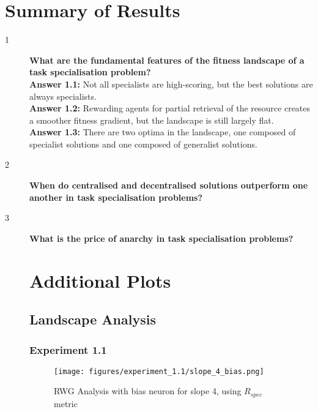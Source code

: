 \documentclass[12pt]{article}
\begin{document}
\appendix

\section{Summary of Results}

\begin{description}
\item[1] \textbf{What are the fundamental features of the fitness landscape of a task specialisation problem?}\\

\textbf{Answer 1.1:} Not all specialists are high-scoring, but the best solutions are always specialists.\\

\textbf{Answer 1.2:} Rewarding agents for partial retrieval of the resource creates a smoother fitness gradient, but the landscape is still largely flat.\\

\textbf{Answer 1.3:} There are two optima in the landscape, one composed of specialist solutions and one composed of generalist solutions.\\

\item[2] \textbf{When do centralised and decentralised solutions outperform one another in task specialisation problems?}\\



\item[3] \textbf{What is the price of anarchy in task specialisation problems?}\\

\section{Additional Plots}

\subsection{Landscape Analysis}

\subsubsection{Experiment 1.1}
\begin{figure}[h]
\centering
\texttt{[image: figures/experiment\_1.1/slope\_4\_bias.png]}
\caption{RWG Analysis with bias neuron for slope 4, using $R_{spec}$ metric}
\label{fig:slope_4_bias}
\end{figure}

\end{description}
\end{document}
